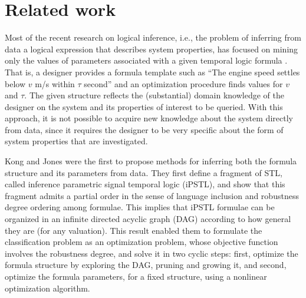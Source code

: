 \section{Related work}\label{sec:relwwork}

Most of the recent research on logical inference, i.e., the problem of inferring from data a logical expression that describes system properties, has focused on mining only the values of parameters associated with a given temporal logic formula \cite{asarin_parametric_2012, jin_mining_2015, yang_querying_2012, bartocci_system_2015}.
That is, a designer provides a formula template such as ``The engine speed settles below $v$ m/s within $\tau$ second'' and an optimization procedure finds values for $v$ and $\tau$. The given structure reflects the (substantial) domain knowledge of the designer on the system and its properties of interest to be queried.
With this approach, it is not possible to acquire new knowledge about the system directly from data, since it requires the designer to be very specific about the form of system properties that are investigated.


Kong and Jones \cite{jones_anomaly_2014,kong_temporal_2014} were the first to propose methods for inferring both the formula structure and its parameters from data.
They first define a fragment of STL, called inference parametric signal temporal logic (iPSTL), and show that this fragment admits a partial order in the sense of language inclusion and robustness degree ordering among formulae.
This implies that iPSTL formulae can be organized in an infinite directed acyclic graph (DAG) 
according to how general they are (for any valuation).
This result enabled them to formulate the classification problem as an optimization problem, whose objective function involves the robustness degree, and solve it in two cyclic steps: first, optimize the formula structure by exploring the DAG, pruning and growing it, and second, optimize the formula parameters, for a fixed structure, using a nonlinear optimization algorithm.

